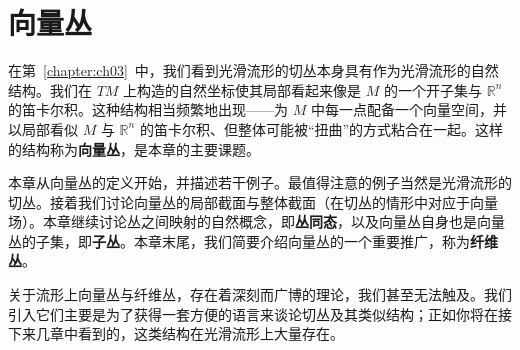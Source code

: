 \documentclass[../main.tex]{subfiles}
\begin{document}
\chapter{向量丛}\label{chapter:ch10-向量丛}

在第~\cref{chapter:ch03}~中，我们看到光滑流形的切丛本身具有作为光滑流形的自然结构。我们在 $TM$ 上构造的自然坐标使其局部看起来像是 $M$ 的一个开子集与 $\mathbb{R}^n$ 的笛卡尔积。这种结构相当频繁地出现——为 $M$ 中每一点配备一个向量空间，并以局部看似 $M$ 与 $\mathbb{R}^n$ 的笛卡尔积、但整体可能被“扭曲”的方式粘合在一起。这样的结构称为\textbf{向量丛}，是本章的主要课题。

本章从向量丛的定义开始，并描述若干例子。最值得注意的例子当然是光滑流形的切丛。接着我们讨论向量丛的局部截面与整体截面（在切丛的情形中对应于向量场）。本章继续讨论丛之间映射的自然概念，即\textbf{丛同态}，以及向量丛自身也是向量丛的子集，即\textbf{子丛}。本章末尾，我们简要介绍向量丛的一个重要推广，称为\textbf{纤维丛}。

关于流形上向量丛与纤维丛，存在着深刻而广博的理论，我们甚至无法触及。我们引入它们主要是为了获得一套方便的语言来谈论切丛及其类似结构；正如你将在接下来几章中看到的，这类结构在光滑流形上大量存在。






\end{document}
